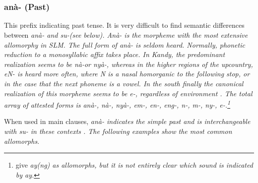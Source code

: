  \\
 \\ 




\subsubsection{anà- (Past)}\label{sec:morph:anà-}
This prefix   indicating past tense. It is very difficult to find semantic differences between \em anà- \em and \em su-\em (see below). \em Anà- \em is the morpheme with the most extensive allomorphy in SLM.  The full form of \em anà- \em is seldom heard. Normally, phonetic reduction to a monosyllabic affix takes place. In Kandy, the predominant realization seems to be \em nà-\em or \em nyà-\em, whereas in the higher regions of the upcountry, \em eN- \em is heard more often, where N is a  nasal homorganic to the following stop, or  in the case that the next phoneme is a vowel. In the south finally the canonical realization of this morpheme seems to be \em e-\em, regardless of environment \citep{Ansaldo2009}.
The total array of attested forms is \em anà-, nà-,  nyà-, em-, en-, eng-, n-, m-, ny-, e-\em.\footnote{\citet[164]{SmithEtAl2007} give \em ay(ng) \em as allomorphs, but it is not entirely clear which sound is indicated by \em ay\em.}

When used in main clauses, \em anà- \em indicates the simple past and is interchangeable with \em su- \em in these contexts \citep[cf.][167]{SmithEtAl2007}. The following examples show the most common allomorphs.
 

